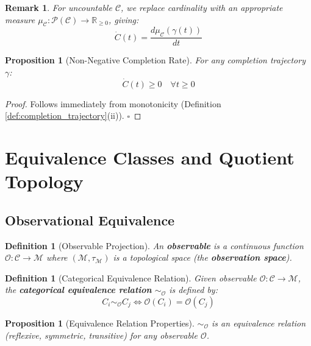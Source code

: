 \documentclass[12pt,a4paper]{article}
\newtheorem{proposition}[theorem]{Proposition}
\newtheorem{definition}[theorem]{Definition}
\newtheorem{remark}[theorem]{Remark}
\begin{document}
\begin{remark}
For uncountable $\mathcal{C}$, we replace cardinality with an appropriate measure $\mu_{\mathcal{C}}: \mathcal{P}(\mathcal{C}) \to \mathbb{R}_{\geq 0}$, giving:
\begin{equation}
\dot{C}(t) = \frac{d\mu_{\mathcal{C}}(\gamma(t))}{dt}
\end{equation}
\end{remark}

\begin{proposition}[Non-Negative Completion Rate]
\label{prop:nonnegative_rate}
For any completion trajectory $\gamma$:
\begin{equation}
\dot{C}(t) \geq 0 \quad \forall t \geq 0
\end{equation}
\end{proposition}

\begin{proof}
Follows immediately from monotonicity (Definition \ref{def:completion_trajectory}(ii)). $\square$
\end{proof}

\section{Equivalence Classes and Quotient Topology}

\subsection{Observational Equivalence}

\begin{definition}[Observable Projection]
\label{def:observable}
An \textbf{observable} is a continuous function $\mathcal{O}: \mathcal{C} \to \mathcal{M}$ where $(\mathcal{M}, \tau_{\mathcal{M}})$ is a topological space (the \textbf{observation space}).
\end{definition}

\begin{definition}[Categorical Equivalence Relation]
\label{def:equivalence_relation}
Given observable $\mathcal{O}: \mathcal{C} \to \mathcal{M}$, the \textbf{categorical equivalence relation} $\sim_{\mathcal{O}}$ is defined by:
\begin{equation}
C_i \sim_{\mathcal{O}} C_j \iff \mathcal{O}(C_i) = \mathcal{O}(C_j)
\end{equation}
\end{definition}

\begin{proposition}[Equivalence Relation Properties]
\label{prop:equiv_relation}
$\sim_{\mathcal{O}}$ is an equivalence relation (reflexive, symmetric, transitive) for any observable $\mathcal{O}$.
\end{proposition}
\end{document}
